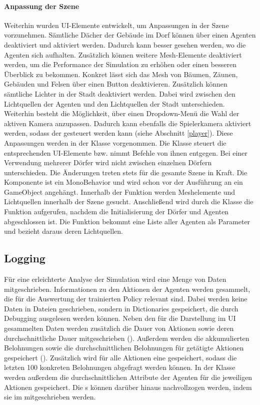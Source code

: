 \paragraph{Anpassung der Szene}\label{szene_anpassung_ui}
Weiterhin wurden UI-Elemente entwickelt, um Anpassungen in der Szene vorzunehmen. Sämtliche Dächer der Gebäude im Dorf können über einen Agenten deaktiviert und aktiviert werden. Dadurch kann besser gesehen werden, wo die Agenten sich aufhalten. Zusätzlich können weitere Mesh-Elemente deaktiviert werden, um die Performance der Simulation zu erhöhen oder einen besseren Überblick zu bekommen. Konkret lässt sich das Mesh von Bäumen, Zäunen, Gebäuden und Felsen über einen Button deaktivieren. Zusätzlich können sämtliche Lichter in der Stadt deaktiviert werden. Dabei wird zwischen den Lichtquellen der Agenten und den Lichtquellen der Stadt unterschieden.
Weiterhin besteht die Möglichkeit, über einen Dropdown-Menü die Wahl der aktiven Kamera anzupassen. Dadurch kann ebenfalls die Spielerkamera aktiviert werden, sodass der  gesteuert werden kann (siehe Abschnitt \ref{player}).
Diese Anpassungen werden in der Klasse  vorgenommen. Die Klasse steuert die entsprechenden UI-Elemente bzw. nimmt Befehle von ihnen entgegen. Bei einer Verwendung mehrerer Dörfer wird nicht zwischen einzelnen Dörfern unterschieden. Die Änderungen treten stets für die gesamte Szene in Kraft. Die Komponente  ist ein MonoBehavior und wird schon vor der Ausführung an ein GameObject angehängt. Innerhalb der Funktion  werden Meshelemente und Lichtquellen innerhalb der Szene gesucht. Anschließend wird durch die Klasse  die Funktion  aufgerufen, nachdem die Initialisierung der Dörfer und Agenten abgeschlossen ist. Die Funktion  bekommt eine Liste aller Agenten als Parameter und bezieht daraus deren Lichtquellen.


\subsection{Logging}\label{village_logging}
Für eine erleichterte Analyse der Simulation wird eine Menge von Daten mitgeschrieben. Informationen zu den Aktionen der Agenten werden gesammelt, die für die Auswertung der trainierten Policy relevant sind. Dabei werden keine Daten in Dateien geschrieben, sondern in Dictionaries gespeichert, die durch Debugging ausgelesen werden können. Neben den für die Darstellung im UI gesammelten Daten werden zusätzlich die Dauer von Aktionen sowie deren durchschnittliche Dauer mitgeschrieben (). Außerdem werden die akkumulierten Belohnungen sowie die durchschnittlichen Belohnungen für getätigte Aktionen gespeichert (). Zusätzlich wird für alle Aktionen eine  gespeichert, sodass die letzten 100 konkreten Belohnungen abgefragt werden können. In der Klasse  werden außerdem die durchschnittlichen Attribute der Agenten für die jeweiligen Aktionen gespeichert. Die s können darüber hinaus nachvollzogen werden, indem sie im  mitgeschrieben werden.

